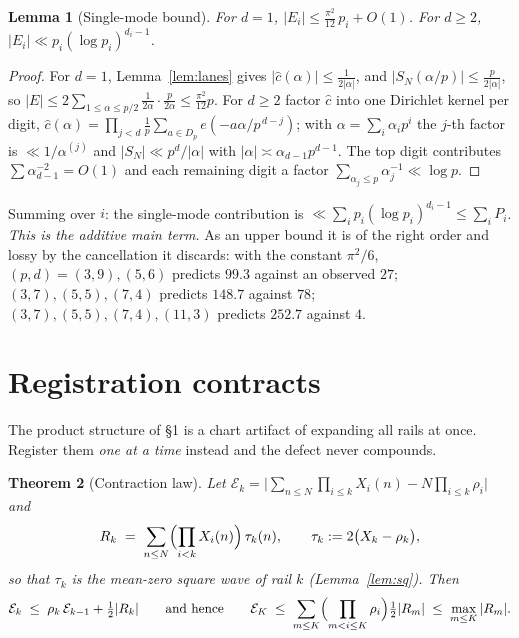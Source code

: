 \documentclass[11pt]{article}
\newtheorem{theorem}{Theorem}
\newtheorem{lemma}[theorem]{Lemma}
\newcommand{\e}[1]{e\!\left(#1\right)}
\begin{document}
\begin{lemma}[Single-mode bound]\label{lem:single}
For $d=1$, $|E_i|\le\frac{\pi^2}{12}\,p_i+O(1)$.  For $d\ge2$,
$|E_i|\ll p_i(\log p_i)^{d_i-1}$.
\end{lemma}

\begin{proof}
For $d=1$, Lemma~\ref{lem:lanes} gives $|\hat c(\alpha)|\le\frac1{2|\alpha|}$, and
$|S_N(\alpha/p)|\le\frac{p}{2|\alpha|}$, so
$|E|\le2\sum_{1\le\alpha\le p/2}\frac1{2\alpha}\cdot\frac{p}{2\alpha}\le\frac{\pi^2}{12}p$.
For $d\ge2$ factor $\hat c$ into one Dirichlet kernel per digit,
$\hat c(\alpha)=\prod_{j<d}\frac1p\sum_{a\in D_p}\e{-a\alpha/p^{\,d-j}}$; with
$\alpha=\sum_i\alpha_ip^i$ the $j$-th factor is $\ll1/\alpha^{(j)}$ and
$|S_N|\ll p^d/|\alpha|$ with $|\alpha|\asymp\alpha_{d-1}p^{d-1}$.  The top digit
contributes $\sum\alpha_{d-1}^{-2}=O(1)$ and each remaining digit a factor
$\sum_{\alpha_j\le p}\alpha_j^{-1}\ll\log p$.
\end{proof}

Summing over $i$: the single-mode contribution is
$\ll\sum_ip_i(\log p_i)^{d_i-1}\le\sum_iP_i$.  \emph{This is the additive main term.}
As an upper bound it is of the right order and lossy by the cancellation it discards:
with the constant $\pi^2/6$, $(p,d)=(3,9),(5,6)$ predicts $99.3$ against an observed
$27$; $(3,7),(5,5),(7,4)$ predicts $148.7$ against $78$; $(3,7),(5,5),(7,4),(11,3)$
predicts $252.7$ against $4$.

\section{Registration contracts}

The product structure of \S1 is a chart artifact of expanding all rails at once.
Register them \emph{one at a time} instead and the defect never compounds.

\begin{theorem}[Contraction law]\label{thm:contract}
Let $\mathcal E_k=\bigl|\sum_{n\le N}\prod_{i\le k}X_i(n)-N\prod_{i\le k}\rho_i\bigr|$ and
\[
R_k\;=\;\sum_{n\le N}\Bigl(\prod_{i<k}X_i(n)\Bigr)\,\tau_k(n),
\qquad \tau_k:=2\bigl(X_k-\rho_k\bigr),
\]
so that $\tau_k$ is the mean-zero square wave of rail $k$ (Lemma~\ref{lem:sq}).  Then
\[
\mathcal E_k\;\le\;\rho_k\,\mathcal E_{k-1}+\tfrac12|R_k|
\qquad\text{and hence}\qquad
\mathcal E_K\;\le\;\sum_{m\le K}\Bigl(\prod_{m<i\le K}\rho_i\Bigr)\tfrac12|R_m|
\;\le\;\max_{m\le K}|R_m| .
\]
\end{theorem}
\end{document}
